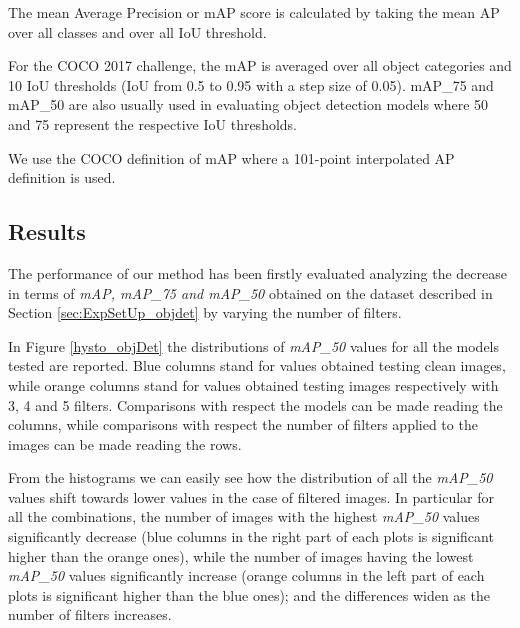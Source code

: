 The mean Average Precision or mAP score is calculated by taking the mean AP over all classes and over all IoU threshold.

For the COCO 2017 challenge, the mAP is averaged over all object categories and 10 IoU thresholds (IoU from 0.5 to 0.95 with a step size of 0.05).
mAP\_75 and mAP\_50 are also usually used in evaluating object detection models where 50 and 75 represent the respective IoU thresholds.

We use the COCO definition of mAP where a 101-point interpolated AP definition is used.






\subsection{Results}
The performance of our method has been firstly evaluated analyzing the decrease in terms of \textit{mAP, mAP\_75 and mAP\_50} obtained on the dataset described in Section \ref{sec:ExpSetUp_objdet} by varying the number of filters.  

In Figure \ref{hysto_objDet} the distributions of \textit{mAP\_50} values for all the models tested are reported. Blue columns stand for values obtained testing clean images, while orange columns stand for values obtained testing images respectively with 3, 4 and 5 filters. Comparisons with respect the models can be made reading the columns, while comparisons with respect the number of filters applied to the images can be made reading the rows.

From the histograms we can easily see how the distribution of all the \textit{mAP\_50} values shift towards lower values in the case of filtered images. In particular for all the combinations, the number of images with the highest \textit{mAP\_50} values  significantly decrease (blue columns in the right part of each plots is significant higher than the orange ones), while the number of images having the lowest \textit{mAP\_50} values significantly increase (orange columns in the left part of each plots is significant higher than the blue ones); and the differences widen as the number of filters increases. 

